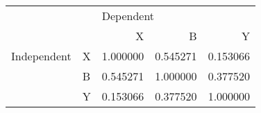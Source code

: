 \begin{tabular}{llrrr}
\toprule
            &   & \multicolumn{3}{l}{Dependent} \\
            &   &         X &         B &         Y \\
\midrule
Independent & X &  1.000000 &  0.545271 &  0.153066 \\
            & B &  0.545271 &  1.000000 &  0.377520 \\
            & Y &  0.153066 &  0.377520 &  1.000000 \\
\bottomrule
\end{tabular}
